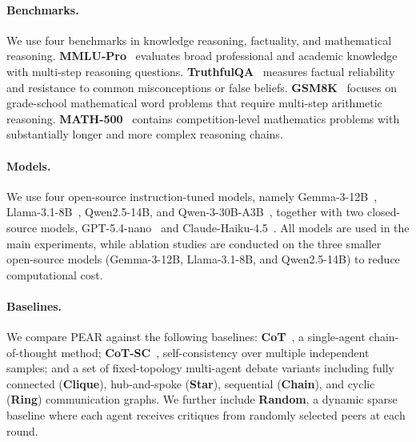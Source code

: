 \paragraph{Benchmarks.}
We use four benchmarks in knowledge reasoning, factuality, and mathematical reasoning. \textbf{MMLU-Pro}~\cite{wang2024mmlu:mmlu-pro} evaluates broad professional and academic knowledge with multi-step reasoning questions. \textbf{TruthfulQA}~\cite{lin2022truthfulqa:truthfulqa} measures factual reliability and resistance to common misconceptions or false beliefs. \textbf{GSM8K}~\cite{cobbe2021training:gsm8k} focuses on grade-school mathematical word problems that require multi-step arithmetic reasoning. \textbf{MATH-500}~\cite{hendrycks2021measuring:math500} contains competition-level mathematics problems with substantially longer and more complex reasoning chains.

\paragraph{Models.}
We use four open-source instruction-tuned models, namely Gemma-3-12B~\cite{gemmateam2025gemma3technicalreport}, Llama-3.1-8B~\cite{grattafiori2024llama}, Qwen2.5-14B, and Qwen-3-30B-A3B~\cite{yang2025qwen3}, together with two closed-source models, GPT-5.4-nano~\cite{openai2026gpt54} and Claude-Haiku-4.5~\cite{anthropic2025haiku45}. All models are used in the main experiments, while ablation studies are conducted on the three smaller open-source models (Gemma-3-12B, Llama-3.1-8B, and Qwen2.5-14B) to reduce computational cost.


\paragraph{Baselines.}
We compare PEAR against the following baselines: \textbf{CoT}~\cite{wei2022chain:cot}, a single-agent chain-of-thought method; \textbf{CoT-SC}~\cite{wang2022self:sc-cot}, self-consistency over multiple independent samples; and a set of fixed-topology multi-agent debate variants including fully connected (\textbf{Clique}), hub-and-spoke (\textbf{Star}), sequential (\textbf{Chain}), and cyclic (\textbf{Ring}) communication graphs. We further include \textbf{Random}, a dynamic sparse baseline where each agent receives critiques from randomly selected peers at each round.

